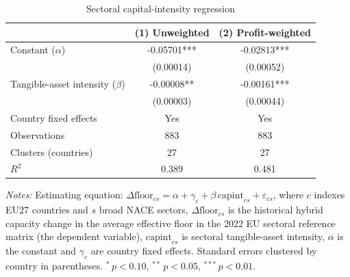 \begin{table}[H]
\centering
\small
\setlength{\tabcolsep}{4pt}
\caption[Sectoral capital-intensity regression]{Sectoral capital-intensity regression}
\label{tab:stage2_h5_regression}
\begin{tabular}{@{}lcc@{}}
\toprule
 & (1) Unweighted & (2) Profit-weighted \\
\midrule
Constant ($\alpha$) & -0.05701*** & -0.02813*** \\
 & (0.00014) & (0.00052) \\
Tangible-asset intensity ($\beta$) & -0.00008** & -0.00161*** \\
 & (0.00003) & (0.00044) \\
Country fixed effects & Yes & Yes \\
Observations & 883 & 883 \\
Clusters (countries) & 27 & 27 \\
$R^2$ & 0.389 & 0.481 \\
\bottomrule
\end{tabular}

\vspace{0.35em}
\noindent\begin{minipage}{\textwidth}
\footnotesize\raggedright\textit{Notes:} Estimating equation: $\Delta\mathrm{floor}_{cs} = \alpha + \gamma_c + \beta\,\mathrm{capint}_{cs} + \varepsilon_{cs}$, where $c$ indexes EU27 countries and $s$ broad NACE sectors, $\Delta\mathrm{floor}_{cs}$ is the historical hybrid capacity change in the average effective floor in the 2022 EU sectoral reference matrix (the dependent variable), $\mathrm{capint}_{cs}$ is sectoral tangible-asset intensity, $\alpha$ is the constant and $\gamma_c$ are country fixed effects. Standard errors clustered by country in parentheses. $^{*}\,p<0.10$, $^{**}\,p<0.05$, $^{***}\,p<0.01$.
\end{minipage}
\end{table}
